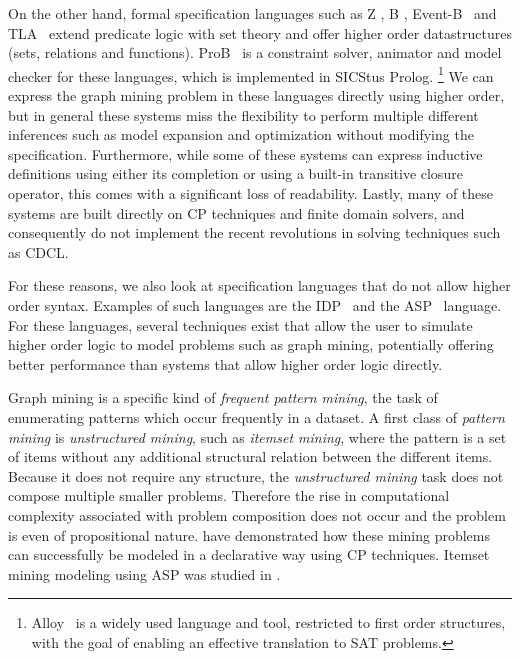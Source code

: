 On the other hand, formal specification languages such as Z \citep{Bowen:Z}, B \citep{Abrial:BBook}, Event-B~\citep{Abrial10} and TLA~\citep{books/aw/Lamport2002}
 extend predicate logic with set theory and offer
 higher order datastructures (sets, relations and functions).
ProB~\citep{journals/sttt/LeuschelB08} is a constraint solver, animator and model checker for these languages,
 which is implemented in SICStus Prolog.%
\footnote{
Alloy~\citep{tosem/Jackson02} is a widely used language and tool,
  restricted to first order structures, with the goal of enabling an effective translation to SAT problems.}
We can express the graph mining problem in these languages directly using higher order, 
but in general these systems miss the flexibility to perform multiple different inferences such as model expansion and optimization without modifying the specification.
Furthermore, while some of these systems can express inductive definitions using either its completion or using a built-in transitive closure operator, this comes with a significant loss of readability.
Lastly, many of these systems are built directly on CP techniques and finite domain solvers, and consequently do not implement the recent revolutions in solving techniques such as CDCL.

For these reasons, we also look at specification languages that do not allow higher order syntax.
Examples of such languages are the IDP~\citep{WarrenBook/DeCatBBD16} and the ASP~\citep{conf/rweb/EiterIK09} language.
For these languages, several techniques exist that allow the user to simulate higher order logic to model problems such as graph mining, potentially offering better performance than systems that allow higher order logic directly.


Graph mining is a specific kind of \emph{frequent pattern mining}, 
the task of enumerating patterns which occur frequently in a dataset.
A first class of \emph{pattern mining} is \emph{unstructured mining}, such as \emph{itemset mining}, where the pattern is a set of items without any additional structural relation between the different items. 
Because it does not require any structure, the \emph{unstructured mining} task does not compose multiple smaller problems.
Therefore the rise in computational complexity associated with problem composition does not occur and the problem is even of propositional nature.
\citet{tias_original} have demonstrated how these mining problems can successfully be modeled in a declarative way using CP techniques.
Itemset mining modeling using ASP was studied in \citet{asp_itemset}.

